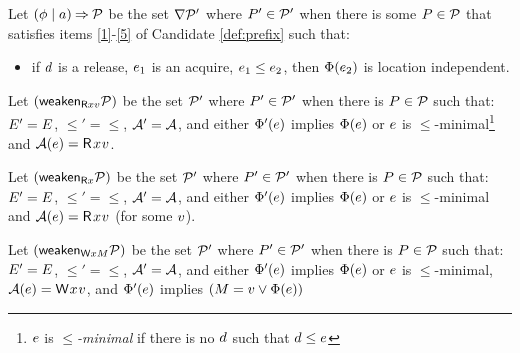 \begin{definition}
  \label{def:cover}
  Let $(\phi \mid a) \mathbin\Rightarrow \mathcal{P}$ be the set $\nabla \mathcal{P}'$ %
  where $P'\in\mathcal{P}'$ when there is some $P\in\mathcal{P}$ that satisfies
  items \ref{1}-\ref{5} of Candidate \ref{def:prefix} such that:
  \begin{itemize}
  \item[{\labeltext[6]{(6)}{6}}]
    if $d$ is a release, $e_1$ is an acquire, $e_1\le e_2$, then $\Phi(e_2)$
    is location independent.
  \end{itemize}  
  
  Let $(\mathsf{weaken}_{\mathsf{R}xv}\mathcal{P})$ be the set $\mathcal{P}'$ where $P'\in\mathcal{P}'$
  when there is $P\in\mathcal{P}$ such that: $E' = E$,
  ${\le'} = {\le}$, $\mathcal{A}' = \mathcal{A}$, and either
  $\Phi'(e)$ implies $\Phi(e)$ or $e$ is
  $\le$-minimal\footnote{$e$ is \emph{$\le$-minimal} if there is no $d$
    such that $d\le e$} and
  $\labelingAct(\aEv)=\DR[\modeRLXquiet]{\aLoc}{\aVal}$.

  Let $(\mathsf{weaken}_{\mathsf{R}x}\mathcal{P})$ be the set $\mathcal{P}'$ where $P'\in\mathcal{P}'$
  when there is $P\in\mathcal{P}$ such that: $E' = E$, ${\le'} = {\le}$,
  $\mathcal{A}' = \mathcal{A}$,
  and either
  $\Phi'(e)$ implies $\Phi(e)$ or $e$ is
  $\le$-minimal and
  $\labelingAct(\aEv)=\DR[\modeRLXquiet]{\aLoc}{\aVal}$ (for some $v$).

  Let $(\mathsf{weaken}_{\mathsf{W}xM}\mathcal{P})$ be the set $\mathcal{P}'$ where $P'\in\mathcal{P}'$
  when there is $P\in\mathcal{P}$ such that: $E' = E$, ${\le'} = {\le}$,
  $\mathcal{A}' = \mathcal{A}$, 
  and either
  $\Phi'(e)$ implies $\Phi(e)$ or $e$ is
  $\le$-minimal,
  $\labelingAct(\aEv)=\DW[\modeRLXquiet]{\aLoc}{\aVal}$, and
  $\Phi'(e)$ implies $(M=v\lor\Phi(e))$
  

\end{definition}

